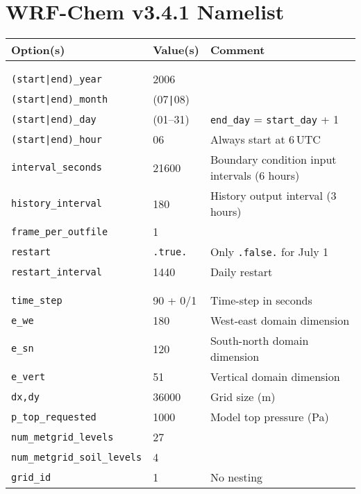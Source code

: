 \chapter{WRF-Chem v3.4.1 Namelist} \label{apdx:namelist}

\ifpdf
    \graphicspath{{Appendix/figures/PNG/}{Appendix/figures/PDF/}{Appendix/figures/}}
\else
    \graphicspath{{Appendix/figures/EPS/}{Appendix/figures/}}
\fi
\begin{singlespacing}
\begin{longtable}{p{2.0in}p{1.1in}p{3.0in}}
{\bf Option(s)} & {\bf Value(s)} & {\bf Comment} \\ \hline  \\
\hspace{-.2in}{\tt \&time\_control} \\
{\tt (start|end)\_year} & 2006 \\
{\tt (start|end)\_month} & (07{\tt|}08) \\
{\tt (start|end)\_day} & (01--31) & {\tt end\_day} = {\tt start\_day} + 1 \\
{\tt (start|end)\_hour} & 06 & Always start at 6\,\unit{UTC} \\
{\tt interval\_seconds} & 21600 & Boundary condition input intervals (6 hours) \\
{\tt history\_interval} & 180 & History output interval (3 hours) \\
{\tt frame\_per\_outfile} & 1 \\
{\tt restart} & {\tt .true.} & Only {\tt .false.} for July 1 \\
{\tt restart\_interval} & 1440 & Daily restart \\
\\
\hspace{-.2in}{\tt \&domains} \\
{\tt time\_step} & 90 + 0/1 & Time-step in seconds \\
{\tt e\_we} & 180 & West-east domain dimension \\
{\tt e\_sn} & 120 & South-north domain dimension \\
{\tt e\_vert} & 51 & Vertical domain dimension \\
{\tt dx,dy} & 36000 & Grid size (\unit{m}) \\
{\tt p\_top\_requested} & 1000 & Model top pressure (\unit{Pa}) \\
{\tt num\_metgrid\_levels} & 27 \\
{\tt num\_metgrid\_soil\_levels} & 4 \\
{\tt grid\_id} & 1 & No nesting \\

\end{longtable}
\end{singlespacing}
